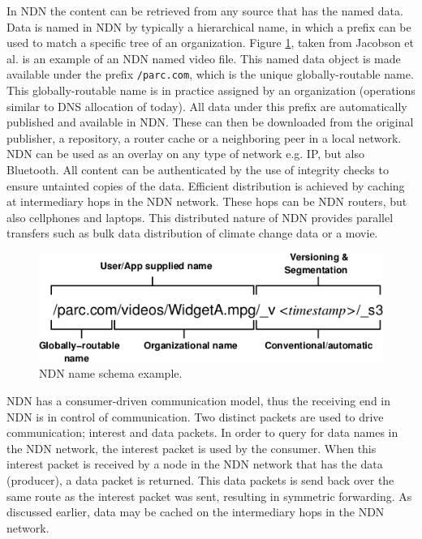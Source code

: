 In NDN the content can be retrieved from any source that has the named data. Data is named in NDN by typically a hierarchical name, in which a prefix can be used to match a specific tree of an organization. Figure \ref{fig:ndn_name}, taken from Jacobson et al. \cite{jacobson2009networking} is an example of an NDN named video file. This named data object is made available under the prefix \texttt{/parc.com}, which is the unique globally-routable name. This globally-routable name is in practice assigned by an organization (operations similar to DNS allocation of today). All data under this prefix are automatically published and available in NDN. These can then be downloaded from the original publisher, a repository, a router cache or a neighboring peer in a local network. NDN can be used as an overlay on any type of network e.g. IP, but also Bluetooth. All content can be authenticated by the use of integrity checks to ensure untainted copies of the data. Efficient distribution is achieved by caching at intermediary hops in the NDN network. These hops can be NDN routers, but also cellphones and laptops. This distributed nature of NDN provides parallel transfers such as bulk data distribution of climate change data or a movie.

\begin{figure}[H]
\centering
\includegraphics[width=\columnwidth/2]{Images/ndn_name.png}
\caption{NDN name schema example.}
\label{fig:ndn_name}
\end{figure}

NDN has a consumer-driven communication model, thus the receiving end in NDN is in control of communication. Two distinct packets are used to drive communication; interest and data packets. In order to query for data names in the NDN network, the interest packet is used by the consumer. When this interest packet is received by a node in the NDN network that has the data (producer), a data packet is returned. This data packets is send back over the same route as the interest packet was sent, resulting in symmetric forwarding. As discussed earlier, data may be cached on the intermediary hops in the NDN network.

